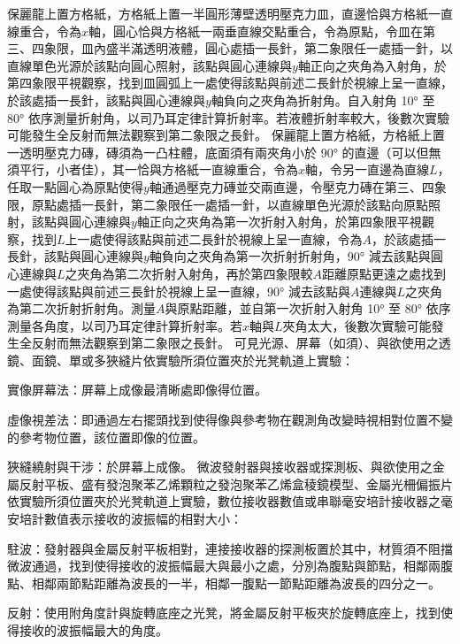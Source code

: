 \documentclass[a4paper,12pt]{report}
\begin{document}
保麗龍上置方格紙，方格紙上置一半圓形薄壁透明壓克力皿，直邊恰與方格紙一直線重合，令為$x$軸，圓心恰與方格紙一兩垂直線交點重合，令為原點，令皿在第三、四象限，皿內盛半滿透明液體，圓心處插一長針，第二象限任一處插一針，以直線單色光源於該點向圓心照射，該點與圓心連線與$y$軸正向之夾角為入射角，於第四象限平視觀察，找到皿圓弧上一處使得該點與前述二長針於視線上呈一直線，於該處插一長針，該點與圓心連線與$y$軸負向之夾角為折射角。自入射角 10° 至 80° 依序測量折射角，以司乃耳定律計算折射率。若液體折射率較大，後數次實驗可能發生全反射而無法觀察到第二象限之長針。
保麗龍上置方格紙，方格紙上置一透明壓克力磚，磚須為一凸柱體，底面須有兩夾角小於 90° 的直邊（可以但無須平行，小者佳），其一恰與方格紙一直線重合，令為$x$軸，令另一直邊為直線$L$，任取一點圓心為原點使得$y$軸通過壓克力磚並交兩直邊，令壓克力磚在第三、四象限，原點處插一長針，第二象限任一處插一針，以直線單色光源於該點向原點照射，該點與圓心連線與$y$軸正向之夾角為第一次折射入射角，於第四象限平視觀察，找到$L$上一處使得該點與前述二長針於視線上呈一直線，令為$A$，於該處插一長針，該點與圓心連線與$y$軸負向之夾角為第一次折射折射角，90° 減去該點與圓心連線與$L$之夾角為第二次折射入射角，再於第四象限較$A$距離原點更遠之處找到一處使得該點與前述三長針於視線上呈一直線，90° 減去該點與$A$連線與$L$之夾角為第二次折射折射角。測量$A$與原點距離，並自第一次折射入射角 10° 至 80° 依序測量各角度，以司乃耳定律計算折射率。若$x$軸與$L$夾角太大，後數次實驗可能發生全反射而無法觀察到第二象限之長針。
可見光源、屏幕（如須）、與欲使用之透鏡、面鏡、單或多狹縫片依實驗所須位置夾於光凳軌道上實驗：
\bit
\item 實像屏幕法：屏幕上成像最清晰處即像得位置。
\item 虛像視差法：即通過左右擺頭找到使得像與參考物在觀測角改變時視相對位置不變的參考物位置，該位置即像的位置。
\item 狹縫繞射與干涉：於屏幕上成像。
\eit
{}
微波發射器與接收器或探測板、與欲使用之金屬反射平板、盛有發泡聚苯乙烯顆粒之發泡聚苯乙烯盒稜鏡模型、金屬光柵偏振片依實驗所須位置夾於光凳軌道上實驗，數位接收器數值或串聯毫安培計接收器之毫安培計數值表示接收的波振幅的相對大小：
\bit
\item 駐波：發射器與金屬反射平板相對，連接接收器的探測板置於其中，材質須不阻擋微波通過，找到使得接收的波振幅最大與最小之處，分別為腹點與節點，相鄰兩腹點、相鄰兩節點距離為波長的一半，相鄰一腹點一節點距離為波長的四分之一。
\item 反射：使用附角度計與旋轉底座之光凳，將金屬反射平板夾於旋轉底座上，找到使得接收的波振幅最大的角度。
\end{document}
